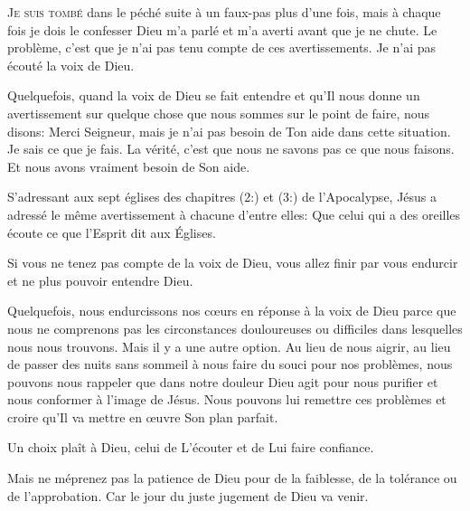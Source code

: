 

\lettrine{J}{e suis tombé} dans le péché suite à un faux-pas
 plus d'une fois, mais à chaque fois \ocadr je dois le confesser \fcadr{}
 Dieu m'a parlé et m'a averti avant que je ne chute.
 Le problème, c'est que je n'ai pas tenu compte de ces avertissements.
 Je n'ai pas écouté la voix de Dieu. 

Quelquefois, quand la voix de Dieu se fait entendre et qu'Il nous donne
 un avertissement sur quelque chose que nous sommes sur le point de faire,
 nous disons:
 \Og Merci Seigneur, mais je n'ai pas besoin de Ton aide dans cette situation.
 Je sais ce que je fais. \Fg{}
 La vérité, c'est que nous ne savons pas ce que nous faisons.
 Et nous avons vraiment besoin de Son aide. 

S'adressant aux sept églises des chapitres (2:)
 et (3:) de l'Apocalypse,
 Jésus a adressé le même avertissement à chacune d'entre elles:
 \Og Que celui qui a des oreilles écoute
 ce que l'Esprit dit aux Églises. \Fg{}


Si vous ne tenez pas compte de la voix de Dieu,
 vous allez finir par vous endurcir et ne plus pouvoir entendre Dieu.

Quelquefois, nous endurcissons nos c\oe{}urs en réponse à la voix de Dieu
 parce que nous ne comprenons pas les circonstances douloureuses ou difficiles
 dans lesquelles nous nous trouvons.
 Mais il y a une autre option. Au lieu de nous aigrir,
 au lieu de passer des nuits sans sommeil à nous faire du souci
 pour nos problèmes, nous pouvons nous rappeler que dans notre douleur Dieu
 agit pour nous purifier et nous conformer à l'image de Jésus.
 Nous pouvons lui remettre ces problèmes et croire qu'Il va mettre
 en \oe{}uvre Son plan parfait. 

Un choix plaît à Dieu, celui de L'écouter et de Lui faire confiance. 

Mais ne méprenez pas la patience de Dieu pour de la faiblesse,
 de la tolérance ou de l'approbation.
 Car le jour du juste jugement de Dieu va venir.

\dvrule



